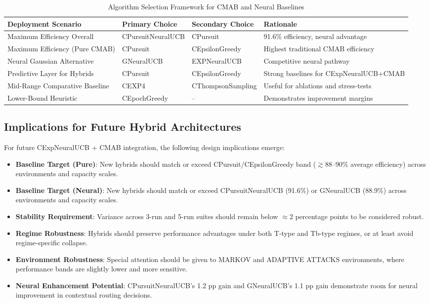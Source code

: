 \documentclass[12pt,a4paper]{article}
\begin{document}
\begin{table}[H]
\scriptsize
\centering
\caption{Algorithm Selection Framework for CMAB and Neural Baselines}
\begin{tabular}{|l|l|l|l|}
\hline
\textbf{Deployment Scenario} & \textbf{Primary Choice} & \textbf{Secondary Choice} & \textbf{Rationale} \\
\hline
\hline
Maximum Efficiency Overall & CPursuitNeuralUCB & CPursuit & 91.6\% efficiency, neural advantage \\
Maximum Efficiency (Pure CMAB) & CPursuit & CEpsilonGreedy & Highest traditional CMAB efficiency \\
Neural Gaussian Alternative & GNeuralUCB & EXPNeuralUCB & Competitive neural pathway \\
Predictive Layer for Hybrids & CPursuit & CEpsilonGreedy & Strong baselines for CExpNeuralUCB+CMAB \\
Mid-Range Comparative Baseline & CEXP4 & CThompsonSampling & Useful for ablations and stress-tests \\
Lower-Bound Heuristic & CEpochGreedy & -- & Demonstrates improvement margins \\
\hline
\end{tabular}
\end{table}

\subsection{Implications for Future Hybrid Architectures}

For future CExpNeuralUCB + CMAB integration, the following design implications emerge:

\begin{itemize}
\item \textbf{Baseline Target (Pure)}: New hybrids should match or exceed CPursuit/CEpsilonGreedy band ($\gtrsim$88–90\% average efficiency) across environments and capacity scales.
\item \textbf{Baseline Target (Neural)}: New hybrids should match or exceed CPursuitNeuralUCB (91.6\%) or GNeuralUCB (88.9\%) across environments and capacity scales.
\item \textbf{Stability Requirement}: Variance across 3-run and 5-run suites should remain below $\approx$2 percentage points to be considered robust.
\item \textbf{Regime Robustness}: Hybrids should preserve performance advantages under both T-type and Tb-type regimes, or at least avoid regime-specific collapse.
\item \textbf{Environment Robustness}: Special attention should be given to MARKOV and ADAPTIVE ATTACKS environments, where performance bands are slightly lower and more sensitive.
\item \textbf{Neural Enhancement Potential}: CPursuitNeuralUCB's 1.2 pp gain and GNeuralUCB's 1.1 pp gain demonstrate room for neural improvement in contextual routing decisions.
\end{itemize}
\end{document}
